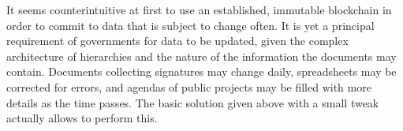 
It seems counterintuitive at first to use an established, immutable blockchain in order to commit to data that is subject to change often. It is yet a principal requirement of governments for data to be updated, given the complex architecture of hierarchies and the nature of the information the documents may contain. Documents collecting signatures may change daily, spreadsheets may be corrected for errors, and agendas of public projects may be filled with more details as the time passes. The basic solution given above with a small tweak actually allows to perform this. 

